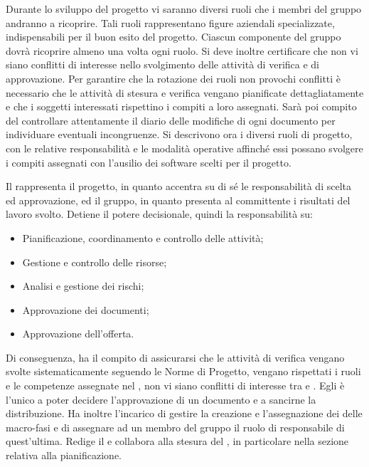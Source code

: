 \documentclass[12pt,a4paper]{article}
\begin{document}
Durante lo sviluppo del progetto vi saranno diversi ruoli che i membri del gruppo andranno a ricoprire. Tali ruoli rappresentano figure aziendali specializzate, indispensabili per il buon esito del progetto. Ciascun componente del gruppo dovrà ricoprire almeno una volta ogni ruolo. Si deve inoltre certificare che non vi siano conflitti di interesse nello svolgimento delle attività di verifica e di approvazione.
Per garantire che la rotazione dei ruoli non provochi conflitti è necessario che le attività di stesura e verifica vengano pianificate dettagliatamente e che i soggetti interessati rispettino i compiti a loro assegnati. Sarà poi compito del \VR{} controllare attentamente il diario delle modifiche di ogni documento per individuare eventuali incongruenze.
Si descrivono ora i diversi ruoli di progetto, con le relative responsabilità e le modalità operative affinché essi possano svolgere i compiti assegnati con l'ausilio dei software scelti per il progetto.

Il \PM{} rappresenta il progetto, in quanto accentra su di sé le responsabilità di scelta ed approvazione, ed il gruppo, in quanto presenta al committente i risultati del lavoro svolto.
Detiene il potere decisionale, quindi la responsabilità su:
\begin{itemize}
  \item Pianificazione, coordinamento e controllo delle attività;
  \item Gestione e controllo delle risorse;
  \item Analisi e gestione dei rischi;
  \item Approvazione dei documenti;
  \item Approvazione dell'offerta.
\end{itemize}

Di conseguenza, ha il compito di assicurarsi che le attività di verifica vengano svolte sistematicamente seguendo le Norme di Progetto, vengano rispettati i ruoli e le competenze assegnate nel \PdP{}, non vi siano conflitti di interesse tra \textit{} e
\textit{}. Egli è l'unico a poter decidere l'approvazione di un documento e a sancirne la distribuzione.
Ha inoltre l'incarico di gestire la creazione e l'assegnazione dei \textit{} delle macro-fasi e di assegnare ad un membro del gruppo il ruolo di responsabile di quest'ultima.
Redige il \PdP{} e collabora alla stesura del \PdQ{}, in particolare nella sezione relativa alla pianificazione.
\end{document}
